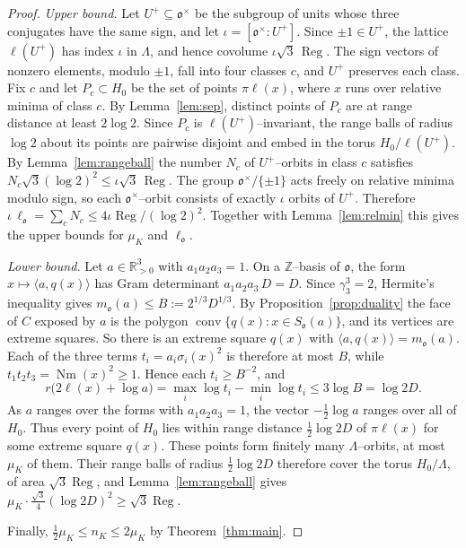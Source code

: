 \documentclass[11pt,reqno]{amsart}
\theoremstyle{plain}
\theoremstyle{definition}
\newcommand{\Z}{\mathbb{Z}}
\newcommand{\R}{\mathbb{R}}
\newcommand{\Nm}{\operatorname{Nm}}
\newcommand{\conv}{\operatorname{conv}}
\newcommand{\Reg}{\operatorname{Reg}}
\newcommand{\Ok}{\mathfrak{o}}
\newcommand{\nK}{n_K}
\newcommand{\muK}{\mu_K}
\begin{document}
\begin{proof}
\emph{Upper bound.} Let $U^+\subseteq\Ok^\times$ be the subgroup of units whose three conjugates have the same
sign, and let $\iota=[\Ok^\times:U^+]$. Since $\pm1\in U^+$, the lattice $\ell(U^+)$ has index $\iota$ in
$\Lambda$, and hence covolume $\iota\sqrt3\,\Reg$. The sign vectors of nonzero elements, modulo $\pm1$,
fall into four classes $c$, and $U^+$ preserves each class. Fix $c$ and let $P_c\subset H_0$ be the set of
points $\pi\ell(x)$, where $x$ runs over relative minima of class $c$. By Lemma~\ref{lem:sep}, distinct points
of $P_c$ are at range distance at least $2\log2$. Since $P_c$ is $\ell(U^+)$--invariant, the range balls of
radius $\log2$ about its points are pairwise disjoint and embed in the torus $H_0/\ell(U^+)$. By
Lemma~\ref{lem:rangeball} the number $N_c$ of $U^+$--orbits in class $c$ satisfies
$N_c\sqrt3(\log2)^2\le\iota\sqrt3\,\Reg$. The group $\Ok^\times/\{\pm1\}$ acts freely on relative minima modulo
sign, so each $\Ok^\times$--orbit consists of exactly $\iota$ orbits of $U^+$. Therefore
$\iota\,\ell_\Ok=\sum_cN_c\le4\iota\Reg/(\log2)^2$. Together with Lemma~\ref{lem:relmin} this gives the upper
bounds for $\muK$ and $\ell_\Ok$.

\emph{Lower bound.} Let $a\in\R^3_{>0}$ with $a_1a_2a_3=1$. On a $\Z$--basis of $\Ok$, the form
$x\mapsto\langle a,q(x)\rangle$ has Gram determinant $a_1a_2a_3\,D=D$. Since $\gamma_3^3=2$, Hermite's
inequality gives $m_\Ok(a)\le B:=2^{1/3}D^{1/3}$. By Proposition~\ref{prop:duality} the face of $C$ exposed by
$a$ is the polygon $\conv\{q(x):x\in S_\Ok(a)\}$, and its vertices are extreme squares. So there is an extreme
square $q(x)$ with $\langle a,q(x)\rangle=m_\Ok(a)$. Each of the three terms $t_i=a_i\sigma_i(x)^2$ is therefore
at most $B$, while $t_1t_2t_3=\Nm(x)^2\ge1$. Hence each $t_i\ge B^{-2}$, and
\[
r\big(2\ell(x)+\log a\big)=\max_i\log t_i-\min_i\log t_i\le3\log B=\log 2D .
\]
As $a$ ranges over the forms with $a_1a_2a_3=1$, the vector $-\tfrac12\log a$ ranges over all of $H_0$. Thus
every point of $H_0$ lies within range distance $\tfrac12\log2D$ of $\pi\ell(x)$ for some extreme square
$q(x)$. These points form finitely many $\Lambda$--orbits, at most $\muK$ of them. Their range balls of radius
$\tfrac12\log2D$ therefore cover the torus $H_0/\Lambda$, of area $\sqrt3\Reg$, and Lemma~\ref{lem:rangeball}
gives $\muK\cdot\tfrac{\sqrt3}{4}(\log2D)^2\ge\sqrt3\Reg$.

Finally, $\tfrac12\muK\le\nK\le2\muK$ by Theorem~\ref{thm:main}.
\end{proof}
\end{document}
